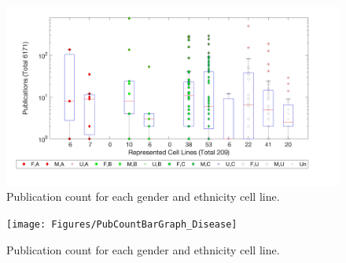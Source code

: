 \documentclass[10pt]{article}
\begin{document}
\begin{figure}[h!]
\centering
\includegraphics[width=0.98\columnwidth]{Figures/PubCountBarGraph}
\caption{\label{pcbg}Publication count for each gender and ethnicity cell line.}
\end{figure}

\begin{figure}[h!]
\centering
\texttt{[image: Figures/PubCountBarGraph\_Disease]}
\caption{\label{pcbg}Publication count for each gender and ethnicity cell line.}
\end{figure}




\enddocument
\end{document}
